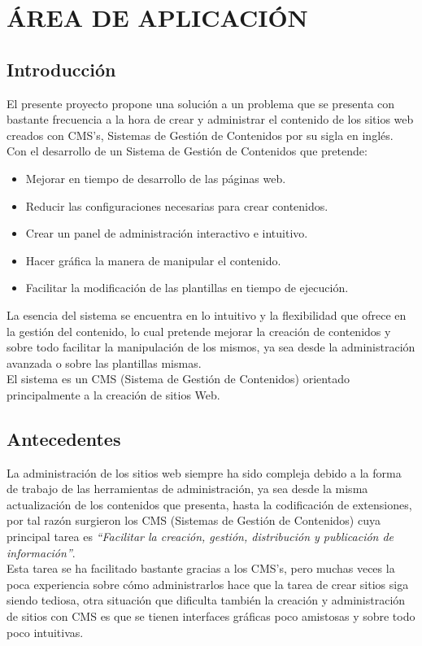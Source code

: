 
\chapter{\'AREA DE APLICACI\'ON}
\newpage
\section{Introducci\'on}

El presente proyecto propone una soluci\'on a un problema que se presenta con bastante frecuencia a la hora de crear y administrar el contenido de los sitios web creados con CMS's, Sistemas de Gesti\'on de Contenidos por su sigla en ingl\'es.\\
Con el desarrollo de un Sistema de Gesti\'on de Contenidos que pretende:

\begin{itemize}
\item Mejorar en tiempo de desarrollo de las p\'aginas web.
\item Reducir las configuraciones necesarias para crear contenidos.
\item Crear un panel de administraci\'on interactivo e intuitivo.
\item Hacer gr\'afica la manera de manipular el contenido.
\item Facilitar la modificaci\'on de las plantillas en tiempo de ejecuci\'on.
\end{itemize}

La esencia del sistema se encuentra en lo intuitivo y la flexibilidad que ofrece en la gesti\'on del contenido, lo cual pretende mejorar la creaci\'on de contenidos y sobre todo facilitar la manipulaci\'on de los mismos, ya sea desde la administraci\'on avanzada o sobre las plantillas mismas.\\
El sistema es un CMS (Sistema de Gesti\'on de Contenidos) orientado principalmente a la creaci\'on de sitios Web.

\section{Antecedentes}
La administraci\'on de los sitios web siempre ha sido compleja debido a la forma de trabajo de las herramientas de administraci\'on, ya sea desde la misma actualizaci\'on de los contenidos que presenta, hasta la codificaci\'on de extensiones, por tal raz\'on surgieron los CMS (Sistemas de Gesti\'on de Contenidos) cuya principal tarea es  \textit{``Facilitar la creaci\'on, gesti\'on, distribuci\'on y publicaci\'on de informaci\'on''}.\\
Esta tarea se ha facilitado bastante gracias a los CMS's, pero muchas veces la poca experiencia sobre c\'omo administrarlos hace que la tarea de crear sitios siga siendo tediosa, otra situaci\'on que dificulta tambi\'en la creaci\'on y administraci\'on de sitios con CMS es que se tienen interfaces gr\'aficas poco amistosas y sobre todo poco intuitivas.

